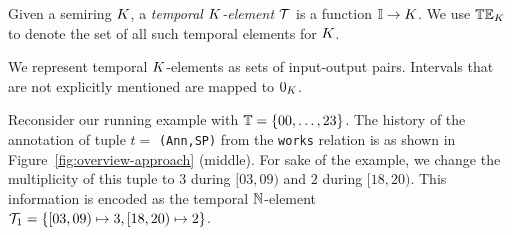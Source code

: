 \begin{defi}
Given a semiring $K$, a \emph{temporal $K$-element} $\mathcal{T}$ is a function $\mathbb{I} \to K$. We use $\mathbb{TE}_{{K}}$ to denote the set of all such temporal elements for $K$.
\end{defi}

We represent temporal $K$-elements  as sets of input-output pairs.  Intervals that are not explicitly mentioned are %
mapped
to $0_K$. 

\begin{exam}\label{ex:temp-k-elem}
Reconsider our running example with $\mathbb{T} = \{ 00, \ldots, 23
  \}$.
  The history of the annotation of tuple $t = $ \texttt{(Ann,SP)}
  from the \texttt{works} relation is as shown in
  Figure~\ref{fig:overview-approach} (middle). For sake of the example, we change the multiplicity of this tuple to $3$ during $[03,09)$ and $2$ during $[18,20)$. This information is encoded as the temporal
  ${\mathbb{N}}$-element $\mathcal{T}_1 = \{[03, 09) \mapsto 3, [18,20) \mapsto 2\}$. %
\end{exam}

